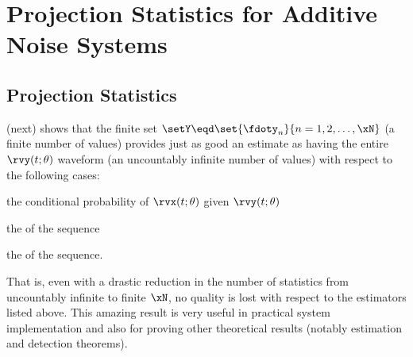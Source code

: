 \chapter{Projection Statistics for Additive Noise Systems}
\section{Projection Statistics}
 (next) shows that the finite set
$\setY\eqd\set{\fdoty_n}{n=1,2,\ldots,\xN}$ (a finite number of values) provides just as
good an estimate as having the entire $\rvy(t;\theta)$ waveform
(an uncountably infinite number of values)
with respect to the following cases:
\begin{enume}
   \item the conditional probability of $\rvx(t;\theta)$ given $\rvy(t;\theta)$
   \item the  of the sequence
   \item the   of the sequence.
\end{enume}
That is, even with a drastic reduction in the number of statistics
from uncountably infinite to finite $\xN$,
no quality is lost with respect to the estimators listed above.
This amazing result is very useful in practical system implementation
and also for proving other theoretical results
(notably estimation and detection theorems).

